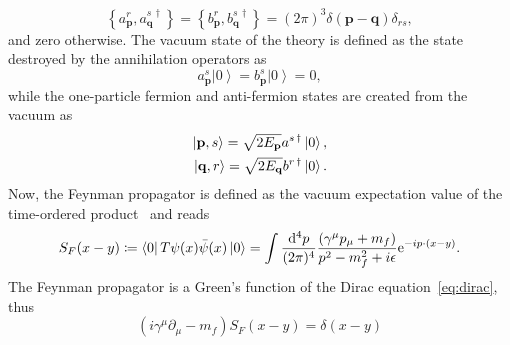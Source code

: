 \begin{equation}
\left\{ a^{r}_\mathbf{p},a^{s\,\dagger}_\mathbf{q}\right\} = \left\{ b^{r}_\mathbf{p},b^{s\,\dagger}_\mathbf{q}\right\} = (2\pi)^3 \delta (\mathbf{p}-\mathbf{q})\delta_{rs},
\end{equation}
and zero otherwise. The vacuum state of the theory is defined as the state destroyed by the annihilation operators as
\begin{equation}
a^s_\mathbf{p}\left|0\right> = b^s_\mathbf{p}\left|0\right> = 0,
\end{equation}
while the one-particle fermion and anti-fermion states are created from the vacuum as
\begin{align}
\left|\mathbf{p},s\right> = \sqrt{2E_\mathbf{p}}a^{s\,\dagger}\left|0\right>,\notag\\
\left|\mathbf{q},r\right> = \sqrt{2E_\mathbf{q}}b^{r\,\dagger}\left|0\right>.
\end{align}
Now, the Feynman propagator is defined as the vacuum expectation value of the time-ordered product~\cite[Section 3.5.]{peskin1995} and reads
\begin{equation}
S_F(x-y)\coloneqq \left<0\right|T\psi(x)\bar{\psi}(x)\left|0\right>=\int \frac{\mathrm{d}^4p}{(2\pi)^4}\frac{ (\gamma^\mu p_\mu+m_f)}{p^2-m_f^2+i\epsilon}\text{e}^{-ip\cdot(x-y)}.
\label{eq:freepropdef}
\end{equation}
The Feynman propagator is a Green's function of the Dirac equation~\eqref{eq:dirac}, thus
\begin{equation}
\left(i\gamma^\mu \partial_\mu -m_f\right)S_F(x-y)=\delta(x-y)
\label{eq:freeprop}
\end{equation} 
